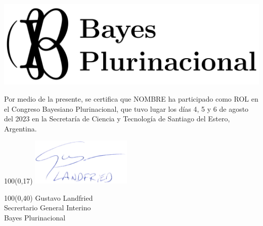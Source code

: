 \documentclass[a4paper,11pt]{letter}
\begin{document}
\begin{landscape} \centering
\includegraphics[width=14cm]{BP.pdf}

\vspace{1.75cm}


\vspace{1cm}


\LARGE
Por medio de la presente, se certifica que NOMBRE ha participado como ROL en el Congreso Bayesiano Plurinacional, que tuvo lugar los días 4, 5 y 6 de agosto del 2023 en la Secretaría de Ciencia y Tecnología de Santiago del Estero, Argentina.



\begin{textblock}{100}(0,17)
\phantom{.} \hfill \includegraphics[width=4.8cm]{firma.png}\hspace{2cm}\phantom{.} \\[0cm]
\end{textblock}
\begin{textblock}{100}(0,40)
 \phantom{.} \hfill Gustavo Landfried \hspace{2.5cm}\phantom{.}\\ \small
\phantom{.} \hfill Secrertario General Interino \hspace{2.5cm}\phantom{.}\\
\phantom{.} \hfill Bayes Plurinacional \hspace{2.5cm}\phantom{.}\\
\end{textblock}


\end{landscape}
\end{document}
